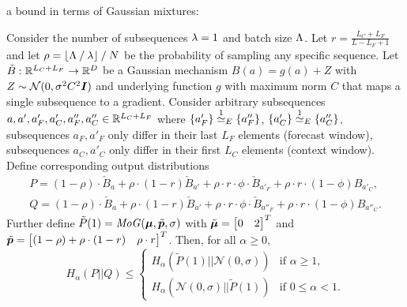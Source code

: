 a bound in terms of Gaussian mixtures:
\begin{lemma}
    Consider the number of subsequences $\lambda = 1$ and 
    batch size $\Lambda$.
    Let $r = \frac{L_C + L_F}{L - L_F + 1}$ and let 
    $\rho = \lfloor \Lambda \mathbin{/} \lambda \rfloor \mathbin{/} N$ be the probability of sampling any specific sequence. 
    Let $\check{B} : {\mathbb{R}}^{L_C + L_F} \rightarrow {\mathbb{R}}^D$ be a Gaussian mechanism
    $B(a) = g(a) + Z$ with $Z \sim \mathcal{N}(0,\sigma^2 C^2 {\bm{I}})$
    and underlying function $g$ with maximum norm $C$ that maps a single subsequence to a gradient.
    Consider arbitrary subsequences $a, a', a'_F, a'_C, a''_F, a''_C \in {\mathbb{R}}^{L_C + L_F}$ where 
    $\{a'_F\} \overset{1}{\simeq}_{E} \{a''_F\}$,
    $\{a'_C\} \overset{1}{\simeq}_{E} \{a''_C\}$,
    subsequences $a_F, a'_F$ only differ in their last $L_F$ elements (forecast window),
    subsequences $a_C, a'_C$ only differ in their first $L_C$ elements (context window).
    Define corresponding output distributions
    \begin{align*}
        P = (1 - \rho) \cdot \check{B}_{a} + \rho \cdot (1-r) \check{B}_{a'} + \rho \cdot r \cdot \phi \cdot   \check{B}_{a'_F} + \rho \cdot r \cdot (1 - \phi) B_{a'_C},
        \\
        Q = (1 - \rho) \cdot \check{B}_{a} + \rho \cdot (1-r) \check{B}_{a'} + \rho \cdot r \cdot \phi \cdot  \check{B}_{a''_F} + \rho \cdot r \cdot (1 - \phi) B_{a''_C}.
    \end{align*}
    Further define
    $\tilde{P}(1) = \mathit{MoG}({\bm{\mu}}, \tilde{{\bm{p}}}, \sigma)$ with
     $\tilde{{\bm{\mu}}} = \begin{bmatrix}
        0 & 2
    \end{bmatrix}^T$ and 
     $\tilde{{\bm{p}}} = \begin{bmatrix} (1 - \rho) + \rho \cdot (1-r) & \rho \cdot r\end{bmatrix}^T$.
     Then, for all $\alpha \geq 0$,
     \begin{equation*}
         H_\alpha(P || Q) \leq 
         \begin{cases}
            H_\alpha(\tilde{P}(1) || \mathcal{N}(0,\sigma)) & \text{if } \alpha \geq 1,\\
            H_\alpha(\mathcal{N}(0,\sigma) || \tilde{P}(1)) & \text{if } 0 \leq \alpha < 1.
        \end{cases}
     \end{equation*}
\end{lemma}

